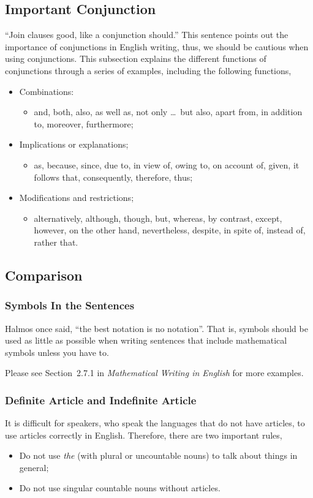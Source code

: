 \subsection{Important Conjunction}
``Join clauses good, like a conjunction should.'' This sentence points out the importance of conjunctions in English writing, thus, we should be cautious when using conjunctions. This subsection explains the different functions of conjunctions through a series of examples, including the following functions,
\begin{itemize}
	\item Combinations:
		\begin{itemize}
			\item and, both, also, as well as, not only \ldots\ but also, apart from, in addition to, moreover, furthermore;
		\end{itemize}
	\item Implications or explanations;
		\begin{itemize}
			\item as, because, since, due to, in view of, owing to, on account of, given, it follows that, consequently, therefore, thus;
		\end{itemize}
	\item Modifications and restrictions;
		\begin{itemize}
			\item alternatively, although, though, but, whereas, by contrast, except, however, on the other hand, nevertheless, despite, in spite of, instead of, rather that.
		\end{itemize}
\end{itemize}


\subsection{Comparison}
\subsubsection{Symbols In the Sentences}
Halmos once said, ``the best notation is no notation''. That is, symbols should be used as little as possible when writing sentences that include mathematical symbols unless you have to.

Please see Section~2.7.1 in \emph{Mathematical Writing in English}\cite{2013数学之英文写作} for more examples.

\subsubsection{Definite Article and Indefinite Article}
It is difficult for speakers, who speak the languages that do not have articles, to use articles correctly in English. Therefore, there are two important rules\cite{Nicholas1998Handbook},
\begin{itemize}
	\item Do not use \emph{the} (with plural or uncountable nouns) to talk about things in general;
	\item Do not use singular countable nouns without articles.
\end{itemize}

